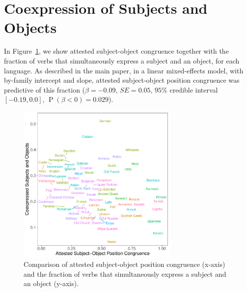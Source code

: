 \documentclass[11pt,a4paper]{article}
\newcommand\mhahn[1]{{\color{red}(#1)}}
\begin{document}



\section{Coexpression of Subjects and Objects}
In Figure~\ref{fig:study2}, we show attested subject-object congruence together with the fraction of verbs that simultaneously express a subject and an object, for each language.
As described in the main paper, in a linear mixed-effects model, with by-family intercept and slope, attested subject-object position congruence was predictive of this fraction ($\beta=-0.09$, $SE=0.05$, $95\%$ credible interval $[-0.19, 0.0]$, $\operatorname{P}(\beta<0) = 0.029$). %


\begin{figure}
    \centering
    \includegraphics[width=0.7\textwidth]{../analysis/figures/objects-order-pureud-byVerb_FORMAT.pdf}
    \caption{Comparison of attested subject-object position congruence (x-axis) and the fraction of verbs that simultaneously express a subject and an object (y-axis).}
    \label{fig:study2}
\end{figure}






\end{document}
